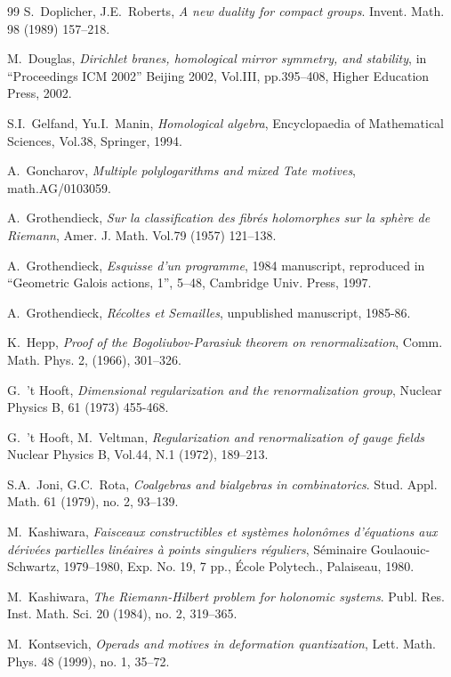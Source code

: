 \documentclass[10pt]{amsart}
\numberwithin{equation}{section}
\begin{document}
\begin{thebibliography}{99}
 S.~Doplicher, J.E.~Roberts, {\em A new duality
for compact groups}. Invent. Math. 98 (1989) 157--218.

 M.~Douglas, {\em Dirichlet branes, homological mirror
symmetry, and stability}, in ``Proceedings ICM 2002'' Beijing 2002,
Vol.III, pp.395--408, Higher Education Press, 2002.

 S.I.~Gelfand, Yu.I.~Manin, {\em Homological algebra},
Encyclopaedia of Mathematical Sciences, Vol.38, Springer, 1994.

 A.~Goncharov, {\em Multiple polylogarithms
and mixed Tate motives}, math.AG/0103059.

 A.~Grothendieck, {\em Sur la classification des
 fibr\'es holomorphes sur la sph\`ere de Riemann}, Amer. J. Math.
 Vol.79 (1957) 121--138.

  A.~Grothendieck, {\em Esquisse d'un programme},
 1984 manuscript, reproduced in ``Geometric Galois actions, 1'', 5--48,
 Cambridge Univ. Press, 1997.

 A.~Grothendieck, {\em R\'ecoltes et Semailles},
unpublished manuscript, 1985-86.

 K.~Hepp, {\em Proof of the Bogoliubov-Parasiuk theorem
 on renormalization}, Comm. Math. Phys. 2, (1966), 301--326.

  G.~'t Hooft, {\em Dimensional regularization and the
 renormalization group}, Nuclear Physics B, 61 (1973) 455-468.

 G.~'t Hooft, M.~Veltman, {\em Regularization and
renormalization of gauge fields} Nuclear Physics B, Vol.44, N.1
(1972), 189--213.

  S.A.~Joni,  G.C.~Rota, {\em Coalgebras and bialgebras
in combinatorics}.  Stud. Appl. Math.  61  (1979), no. 2, 93--139.

 M.~Kashiwara, {\em  Faisceaux constructibles et syst\`emes
holon\^{o}mes d'\'equations aux d\'eriv\'ees partielles lin\'eaires
\`a points singuliers r\'eguliers},  S\'eminaire Goulaouic-Schwartz,
1979--1980,  Exp. No. 19, 7 pp., \'Ecole Polytech., Palaiseau, 1980.

 M.~Kashiwara, {\em  The Riemann-Hilbert problem for
holonomic systems}. Publ. Res. Inst. Math. Sci. 20 (1984), no. 2,
319--365.

 M.~Kontsevich, {\em  Operads and motives in deformation
quantization},  Lett. Math. Phys. 48 (1999), no. 1, 35--72.


\end{thebibliography}
\end{document}
